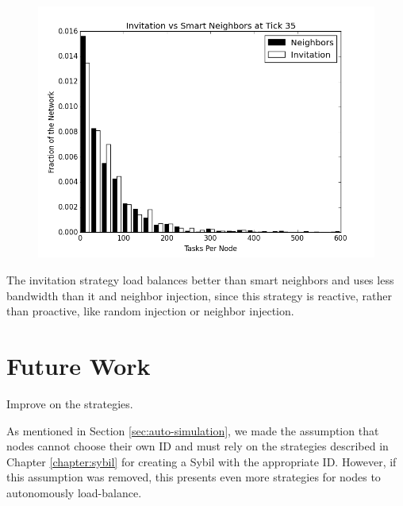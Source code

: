 \begin{figure}
	\centering
	\includegraphics[width=0.7\linewidth]{figs/inviteNeighborsHist35}
	\caption[Invitation  vs smart neighbor injection after 35 ticks.]{}
	\label{fig:inviteNeighborsHist35}
\end{figure}


The invitation strategy load balances better than smart neighbors and uses less bandwidth than it and neighbor injection, since this strategy is reactive, rather than proactive, like random injection or neighbor injection.

\section{Future Work}

Improve on the strategies.

As mentioned in Section \ref{sec:auto-simulation}, we made the assumption that nodes cannot choose their own ID and must rely on the strategies described in Chapter \ref{chapter:sybil}  \cite{sybil-analysis} for creating a Sybil with the appropriate ID.
However, if this assumption was removed, this presents even more strategies for nodes to autonomously load-balance.